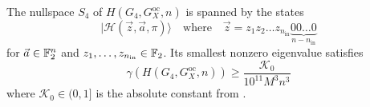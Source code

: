 \documentclass[../thesis-main/thesis-main]{subfiles}
\begin{document}
\begin{lemma}
\label{lem:G_IV}The nullspace $S_4$ of $H(G_{4},G_X^{\text{oc}},n)$ is spanned by
the states 
\begin{equation}
  |\mathcal{H}\left(\vec{z},\vec{a},\pi\right)\rangle\quad\text{where}\quad\vec{z}=z_{1}z_{2}\ldots z_{n_{\text{in}}}\underbrace{00\ldots0}_{n-n_{\text{in}}}\label{eq:history_states_zero_init}
\end{equation}
for $\vec{a}\in\mathbb{F}_2^{n}$ and $z_{1},\ldots,z_{n_{\text{in}}}\in\mathbb{F}_2$.
Its smallest nonzero eigenvalue satisfies
\begin{equation}
\gamma(H(G_{4},G_X^{\text{oc}},n)) \geq \frac{\mathcal{K}_0}{10^{11} M^3n^3}
\end{equation}
where $\mathcal{K}_0\in (0,1]$ is the absolute constant from .
\end{lemma}
\end{document}
